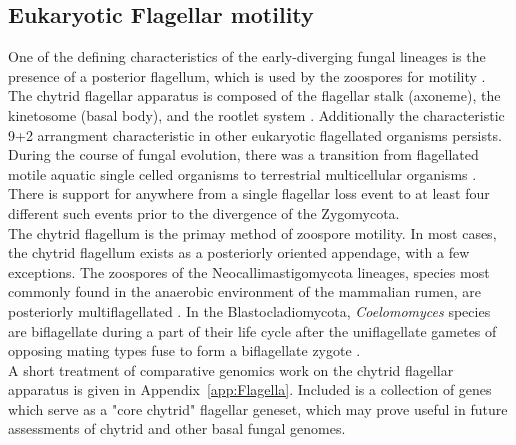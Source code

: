 \subsection*{Eukaryotic Flagellar motility}
One of the defining characteristics of the early-diverging fungal lineages is the presence of a posterior flagellum, which is used by the zoospores for motility \cite{Koch1958}. The chytrid flagellar apparatus is composed of the flagellar stalk (axoneme), the kinetosome (basal body), and the rootlet system \cite{Barr1981}. Additionally the characteristic 9+2 arrangment characteristic in other eukaryotic flagellated organisms persists.\\
\indent During the course of fungal evolution, there was a transition from flagellated motile aquatic single celled organisms to terrestrial multicellular organisms \cite{Taylor2006}. There is support for anywhere from a single flagellar loss event \cite{Liu2006} to at least four different such events \cite{James2006sixGene} prior to the divergence of the Zygomycota.\\
\indent The chytrid flagellum is the primay method of zoospore motility. In most cases, the chytrid flagellum exists as a posteriorly oriented appendage, with a few exceptions. The zoospores of the Neocallimastigomycota lineages, species most commonly found in the anaerobic environment of the mammalian rumen, are posteriorly multiflagellated \cite{Ho1995}. In the Blastocladiomycota, \textit{Coelomomyces} species are biflagellate during a part of their life cycle after the uniflagellate gametes of opposing mating types fuse to form a biflagellate zygote \cite{Padua1986}.\\ 
\indent A short treatment of comparative genomics work on the chytrid flagellar apparatus is given in Appendix~\ref{app:Flagella}. Included is a collection of genes which serve as a "core chytrid" flagellar geneset, which may prove useful in future assessments of chytrid and other basal fungal genomes.\\
